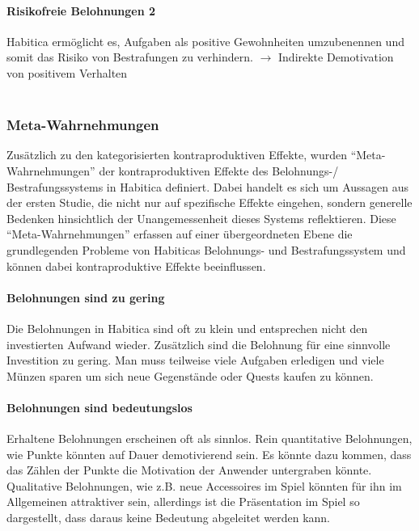 \documentclass[sigconf, nonacm]{acmart}
\begin{document}
\paragraph{Risikofreie Belohnungen 2}\label{sec:cpe7}
Habitica ermöglicht es, Aufgaben als positive Gewohnheiten umzubenennen und somit das Risiko von Bestrafungen zu verhindern.
$\rightarrow$ Indirekte Demotivation von positivem Verhalten 
\\
\\
\subsubsection{Meta-Wahrnehmungen}
Zusätzlich zu den kategorisierten kontraproduktiven Effekte, wurden \enquote{Meta-Wahrnehmungen} der kontraproduktiven Effekte des Belohnungs-/ Bestrafungssystems in Habitica definiert. Dabei handelt es sich um Aussagen aus der ersten Studie, die nicht nur auf spezifische Effekte eingehen, sondern generelle Bedenken hinsichtlich der Unangemessenheit dieses Systems reflektieren. Diese \enquote{Meta-Wahrnehmungen} erfassen auf einer übergeordneten Ebene die grundlegenden Probleme von Habiticas Belohnungs- und Bestrafungssystem und können dabei kontraproduktive Effekte beeinflussen.

\paragraph{Belohnungen sind zu gering}\label{sec:acpe1}
Die Belohnungen in Habitica sind oft zu klein und entsprechen nicht den investierten Aufwand wieder. Zusätzlich sind die Belohnung für eine sinnvolle Investition zu gering. Man muss teilweise viele Aufgaben erledigen und viele Münzen sparen um sich neue Gegenstände oder Quests kaufen zu können.

\paragraph{Belohnungen sind bedeutungslos}\label{sec:acpe2}
Erhaltene Belohnungen erscheinen oft als sinnlos. Rein quantitative Belohnungen, wie Punkte könnten auf Dauer demotivierend sein. Es könnte dazu kommen, dass das Zählen der Punkte die Motivation der Anwender untergraben könnte. Qualitative Belohnungen, wie z.B. neue Accessoires im Spiel könnten für ihn im Allgemeinen attraktiver sein, allerdings ist die Präsentation im Spiel so dargestellt, dass daraus keine Bedeutung abgeleitet werden kann.
\end{document}
